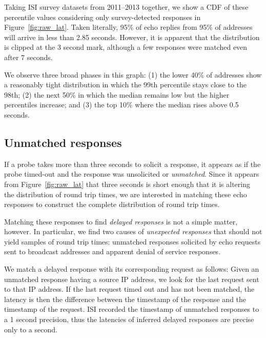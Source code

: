 Taking ISI survey datasets from 2011--2013 together, we show a CDF of
these percentile values considering only survey-detected
responses in Figure~\ref{fig:raw_lat}.  Taken literally, 95\%
of echo replies from 95\% of addresses will arrive in less than
2.85 seconds.  However, it is apparent that the distribution
is clipped at the 3 second mark, although a few responses
were matched even after 7 seconds.   

We observe three broad phases in this graph: (1) the lower
40\% of addresses show a reasonably tight distribution in
which the 99th percentile stays close to the 98th; (2) the
next 50\% in which the median remains low but the higher
percentiles increase; and (3) the top 10\% where the median
rises above 0.5 seconds.


\subsection{Unmatched responses}

If a probe takes more than three seconds to solicit a
response, it appears as if the probe timed-out and the
response was unsolicited or \emph{unmatched}.  Since it
appears from Figure~\ref{fig:raw_lat} that three seconds is
short enough that it is altering the distribution of round
trip times, we are interested in matching these echo
responses to construct the complete distribution of round
trip times.

Matching these responses to find \emph{delayed responses} is
not a simple matter, however.  In particular, we find two
causes of \emph{unexpected responses} that should not yield
samples of round trip times: unmatched responses solicited
by echo requests sent to broadcast addresses and apparent
denial of service responses.


We match a delayed response with its corresponding request
as follows: Given an unmatched response having a source IP
address, we look for the last request sent to that IP
address.  If the last request timed out and has not been matched, the latency is then the difference between the
timestamp of the response and the timestamp of the
request.  ISI recorded the timestamp of unmatched responses
to a 1 second precision, thus the latencies of inferred
delayed responses are precise only to a second.

